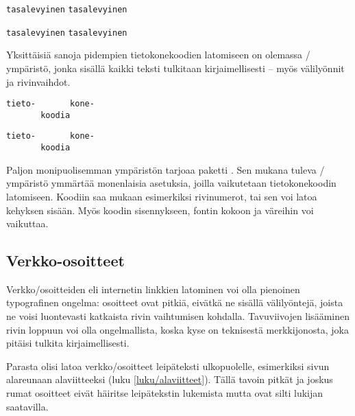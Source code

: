 \begin{koodilohkosis}
\verb.tasalevyinen.   %
\verb|tasalevyinen|   %
\end{koodilohkosis}

\begin{tulossis}
  \verb.tasalevyinen.
  \verb|tasalevyinen|
\end{tulossis}

\noindent
Yksittäisiä sanoja pidempien tietokonekoodien latomiseen on olemassa
\-/ ympäristö, jonka sisällä kaikki teksti
tulkitaan kirjaimellisesti -- myös välilyönnit ja rivinvaihdot.

\begin{koodilohkosis}
\begin{verbatim}
tieto-       kone-
       koodia
\end{verbatim}
\end{koodilohkosis}

\begin{tulossis}
\begin{verbatim}
tieto-       kone-
       koodia
\end{verbatim}
\end{tulossis}

\noindent
Paljon monipuolisemman ympäristön tarjoaa paketti
. Sen mukana tuleva \-/
ympäristö ymmärtää monenlaisia asetuksia, joilla vaikutetaan
tietokonekoodin latomiseen. Koodiin saa mukaan esimerkiksi rivinumerot,
tai sen voi latoa kehyksen sisään. Myös koodin sisennykseen, fontin
kokoon ja väreihin voi vaikuttaa.

\subsection{Verkko-osoitteet}

Verkko\-/osoitteiden eli internetin linkkien latominen voi olla
pienoinen typografinen ongelma: osoitteet ovat pitkiä, eivätkä ne
sisällä välilyöntejä, joista ne voisi luontevasti katkaista rivin
vaihtumisen kohdalla. Tavuviivojen lisääminen rivin loppuun voi olla
ongelmallista, koska kyse on teknisestä merkkijonosta, joka pitäisi
tulkita kirjaimellisesti.

Parasta olisi latoa verkko\-/osoitteet leipäteksti ulkopuolelle,
esimerkiksi sivun alareunaan alaviitteeksi (luku
\ref{luku/alaviitteet}). Tällä tavoin pitkät ja joskus rumat osoitteet
eivät häiritse leipätekstin lukemista mutta ovat silti lukijan
saatavilla.

